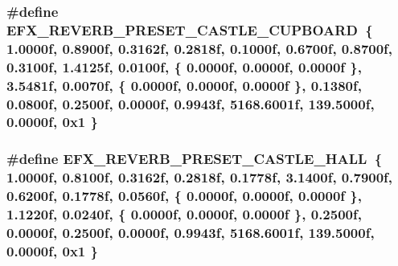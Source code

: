 \subsubsection[{\texorpdfstring{E\+F\+X\+\_\+\+R\+E\+V\+E\+R\+B\+\_\+\+P\+R\+E\+S\+E\+T\+\_\+\+C\+A\+S\+T\+L\+E\+\_\+\+C\+U\+P\+B\+O\+A\+RD}{EFX_REVERB_PRESET_CASTLE_CUPBOARD}}]{\setlength{\rightskip}{0pt plus 5cm}\#define E\+F\+X\+\_\+\+R\+E\+V\+E\+R\+B\+\_\+\+P\+R\+E\+S\+E\+T\+\_\+\+C\+A\+S\+T\+L\+E\+\_\+\+C\+U\+P\+B\+O\+A\+RD~\{ 1.\+0000f, 0.\+8900f, 0.\+3162f, 0.\+2818f, 0.\+1000f, 0.\+6700f, 0.\+8700f, 0.\+3100f, 1.\+4125f, 0.\+0100f, \{ 0.\+0000f, 0.\+0000f, 0.\+0000f \}, 3.\+5481f, 0.\+0070f, \{ 0.\+0000f, 0.\+0000f, 0.\+0000f \}, 0.\+1380f, 0.\+0800f, 0.\+2500f, 0.\+0000f, 0.\+9943f, 5168.\+6001f, 139.\+5000f, 0.\+0000f, 0x1 \}}\hypertarget{efx-presets_8h_aea087279f39010f8ba13a8ae746c741d}{}\label{efx-presets_8h_aea087279f39010f8ba13a8ae746c741d}
\subsubsection[{\texorpdfstring{E\+F\+X\+\_\+\+R\+E\+V\+E\+R\+B\+\_\+\+P\+R\+E\+S\+E\+T\+\_\+\+C\+A\+S\+T\+L\+E\+\_\+\+H\+A\+LL}{EFX_REVERB_PRESET_CASTLE_HALL}}]{\setlength{\rightskip}{0pt plus 5cm}\#define E\+F\+X\+\_\+\+R\+E\+V\+E\+R\+B\+\_\+\+P\+R\+E\+S\+E\+T\+\_\+\+C\+A\+S\+T\+L\+E\+\_\+\+H\+A\+LL~\{ 1.\+0000f, 0.\+8100f, 0.\+3162f, 0.\+2818f, 0.\+1778f, 3.\+1400f, 0.\+7900f, 0.\+6200f, 0.\+1778f, 0.\+0560f, \{ 0.\+0000f, 0.\+0000f, 0.\+0000f \}, 1.\+1220f, 0.\+0240f, \{ 0.\+0000f, 0.\+0000f, 0.\+0000f \}, 0.\+2500f, 0.\+0000f, 0.\+2500f, 0.\+0000f, 0.\+9943f, 5168.\+6001f, 139.\+5000f, 0.\+0000f, 0x1 \}}\hypertarget{efx-presets_8h_a849c407784f05de02d3c3fdff68e573a}{}\label{efx-presets_8h_a849c407784f05de02d3c3fdff68e573a}
